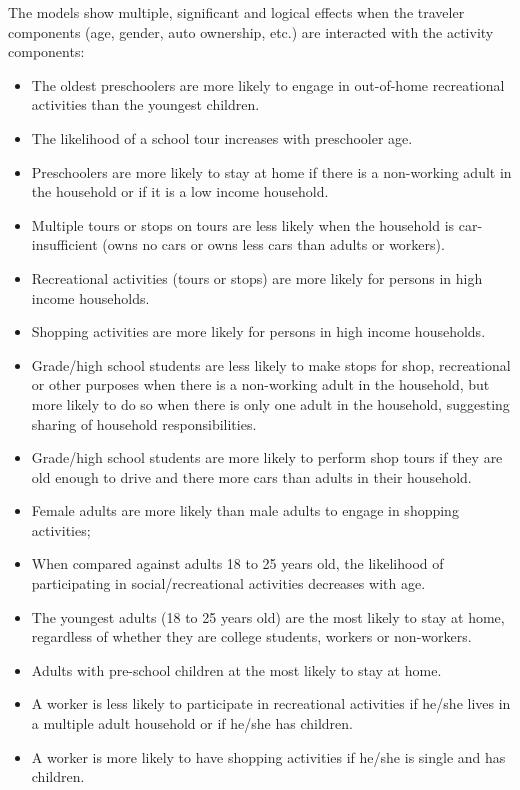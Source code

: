 The models show multiple, significant and logical effects when the traveler components (age, gender, auto ownership, etc.) are interacted with the activity components:
\begin{itemize}
\item The oldest preschoolers are more likely to engage in out-of-home recreational activities than the youngest children.
\item The likelihood of a school tour increases with preschooler age.
\item Preschoolers are more likely to stay at home if there is a non-working adult in the household or if it is a low income household.
\item Multiple tours or stops on tours are less likely when the household is car-insufficient (owns no cars or owns less cars than adults or workers).
\item Recreational activities (tours or stops) are more likely for persons in high income households.
\item Shopping activities are more likely for persons in high income households.
\item Grade/high school students are less likely to make stops for shop, recreational or other purposes when there is a non-working adult in the household, but more likely to do so when there is only one adult in the household, suggesting sharing of household responsibilities.
\item Grade/high school students are more likely to perform shop tours if they are old enough to drive and there more cars than adults in their household.
\item Female adults are more likely than male adults to engage in shopping activities;
\item When compared against adults 18 to 25 years old, the likelihood of participating in social/recreational activities decreases with age.
\item The youngest adults (18 to 25 years old) are the most likely to stay at home, regardless of whether they are college students, workers or non-workers.
\item Adults with pre-school children at the most likely to stay at home.
\item A worker is less likely to participate in recreational activities if he/she lives in a multiple adult household or if he/she has children.
\item A worker is more likely to have shopping activities if he/she is single and has children.
\end{itemize}

